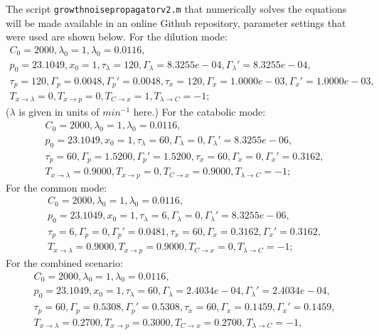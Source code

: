The script \texttt{growthnoisepropagatorv2.m} that numerically solves the equations will be made available in an online Github repository, parameter settings that were used are shown below.
%
For the dilution mode: 
\begin{gather*}
C_0= 2000,
\lambda_0= 1,
\lambda_0= 0.0116, 
\nonumber \\ p_0= 23.1049, 
x_0= 1,
\tau_\lambda= 120,
\Gamma_\lambda= 8.3255e-04,
\Gamma_\lambda'= 8.3255e-04,
\nonumber \\ \tau_p= 120,
\Gamma_p= 0.0048,
\Gamma_p'= 0.0048,
\tau_x= 120,
\Gamma_x= 1.0000e-03,
\Gamma_x'= 1.0000e-03,
\nonumber \\ T_{x\rightarrow\lambda}= 0,
T_{x\rightarrow{p}}= 0,
T_{C\rightarrow{x}}= 1,
T_{\lambda\rightarrow{C}}= -1;
\end{gather*}
%
($\lambda$ is given in units of $min^{-1}$ here.)
For the catabolic mode: 
\begin{gather*}
C_0= 2000,
\lambda_0= 1,
\lambda_0= 0.0116,
\nonumber \\ p_0= 23.1049,
x_0= 1,
\tau_\lambda= 60,
\Gamma_\lambda= 0,
\Gamma_\lambda'= 8.3255e-06,
\nonumber \\ \tau_p= 60,
\Gamma_p= 1.5200,
\Gamma_p'= 1.5200,
\tau_x= 60,
\Gamma_x= 0,
\Gamma_x'= 0.3162,
\nonumber \\ T_{x\rightarrow\lambda}= 0.9000,
T_{x\rightarrow{p}}= 0,
T_{C\rightarrow{x}}= 0.9000,
T_{\lambda\rightarrow{C}}= -1;
\end{gather*}
For the common mode: 
\begin{gather*}
C_0= 2000,
\lambda_0= 1,
\lambda_0= 0.0116,
\nonumber \\p_0= 23.1049,
x_0= 1,
\tau_\lambda= 6,
\Gamma_\lambda= 0,
\Gamma_\lambda'= 8.3255e-06,
\nonumber \\ \tau_p= 6,
\Gamma_p= 0,
\Gamma_p'= 0.0481,
\tau_x= 60,
\Gamma_x= 0.3162,
\Gamma_x'= 0.3162,
\nonumber \\ T_{x\rightarrow\lambda}= 0.9000,
T_{x\rightarrow{p}}= 0.9000,
T_{C\rightarrow{x}}= 0,
T_{\lambda\rightarrow{C}}= -1;
\end{gather*}
For the combined scenario: 
\begin{gather*}
C_0= 2000,
\lambda_0= 1,
\lambda_0= 0.0116,
\nonumber \\p_0= 23.1049,
x_0= 1,
\tau_\lambda= 60,
\Gamma_\lambda= 2.4034e-04,
\Gamma_\lambda'= 2.4034e-04,
\nonumber \\ \tau_p= 60,
\Gamma_p= 0.5308,
\Gamma_p'= 0.5308,
\tau_x= 60,
\Gamma_x= 0.1459,
\Gamma_x'= 0.1459,
\nonumber \\ T_{x\rightarrow\lambda}= 0.2700,
T_{x\rightarrow{p}}= 0.3000,
T_{C\rightarrow{x}}= 0.2700,
T_{\lambda\rightarrow{C}}= -1,
\end{gather*}
